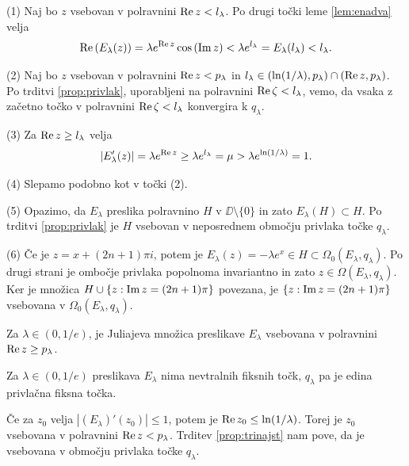 \begin{dokaz}
    (1) Naj bo \(z\) vsebovan v polravnini \(\operatorname{Re} z < l_\lambda\). Po drugi točki leme \ref{lem:enadva} velja
    \[\operatorname{Re} \left( E_\lambda (z) \right) = \lambda e^{\operatorname{Re} z} \cos \left( \operatorname{Im} z \right) < \lambda e^{l_\lambda} = E_\lambda (l_\lambda) < l_\lambda.\]

    (2) Naj bo \(z\) vsebovan v polravnini \(\operatorname{Re} z < p_\lambda\) in \(l_\lambda \in (\ln (1 / \lambda), p_\lambda) \cap (\operatorname{Re} z, p_\lambda)\). Po trditvi \ref{prop:privlak}, uporabljeni na polravnini \(\operatorname{Re} \zeta < l_\lambda\), vemo, da vsaka z začetno točko v polravnini \(\operatorname{Re} \zeta < l_\lambda\) konvergira k \(q_\lambda\).

    (3) Za \(\operatorname{Re} z \geq l_\lambda\) velja
    \[|E_\lambda' (z)| = \lambda e^{\operatorname{Re} z} \geq \lambda e^{l_\lambda} = \mu > \lambda e^{\ln (1 / \lambda)} = 1.\]

    (4) Slepamo podobno kot v točki (2).

    (5) Opazimo, da \(E_\lambda\) preslika polravnino \(H\) v \(\DD \setminus \{0\}\) in zato \(E_\lambda (H) \subset H\). Po trditvi \ref{prop:privlak} je \(H\) vsebovan v neposrednem območju privlaka točke \(q_\lambda\).

    (6) Če je \(z = x + (2n + 1) \pi i\), potem je \(E_\lambda (z) = - \lambda e^x \in H \subset \Omega_0 (E_\lambda, q_\lambda)\). Po drugi strani je ombočje privlaka popolnoma invariantno in zato \(z \in \Omega (E_\lambda, q_\lambda)\). Ker je množica \(H \cup \left\{ z : \operatorname{Im} z = (2n + 1) \pi \right\}\) povezana, je \(\left\{ z : \operatorname{Im} z = (2n + 1) \pi \right\}\) vsebovana v \(\Omega_0 (E_\lambda, q_\lambda)\).
\end{dokaz}

\begin{posledica} \label{cor:jul-e}
    Za \(\lambda \in (0, 1/e)\), je Juliajeva množica preslikave \(E_\lambda\) vsebovana v polravnini \(\operatorname{Re} z \geq p_\lambda\).
\end{posledica}

\begin{posledica}
    Za \(\lambda \in (0, 1/e)\) preslikava \(E_\lambda\) nima nevtralnih fiksnih točk, \(q_\lambda\) pa je edina privlačna fiksna točka.
\end{posledica}

\begin{dokaz}
    Če za \(z_0\) velja \(|(E_\lambda)' (z_0)| \leq 1\), potem je \(\operatorname{Re} z_0 \leq \ln (1 / \lambda)\). Torej je \(z_0\) vsebovana v polravnini \(\operatorname{Re} z < p_\lambda\). Trditev \ref{prop:trinajst} nam pove, da je vsebovana v območju privlaka točke \(q_\lambda\).
\end{dokaz}

